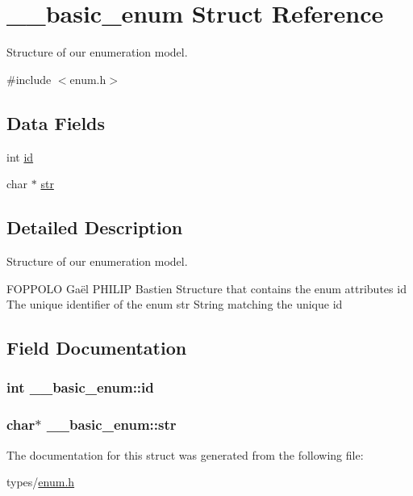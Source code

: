 \hypertarget{struct____basic__enum}{}\section{\+\_\+\+\_\+basic\+\_\+enum Struct Reference}
\label{struct____basic__enum}


Structure of our enumeration model.  




{\ttfamily \#include $<$enum.\+h$>$}

\subsection*{Data Fields}
\begin{DoxyCompactItemize}
\item 
int \hyperlink{struct____basic__enum_acd04c6cfadb03ffe9794095d30f357bc}{id}
\item 
char $\ast$ \hyperlink{struct____basic__enum_ad580200e599931c086006513b3a5a927}{str}
\end{DoxyCompactItemize}


\subsection{Detailed Description}
Structure of our enumeration model. 

F\+O\+P\+P\+O\+LO Gaël  P\+H\+I\+L\+IP Bastien Structure that contains the enum attributes  id The unique identifier of the enum  str String matching the unique id 

\subsection{Field Documentation}
\subsubsection[{\texorpdfstring{id}{id}}]{\setlength{\rightskip}{0pt plus 5cm}int \+\_\+\+\_\+basic\+\_\+enum\+::id}\hypertarget{struct____basic__enum_acd04c6cfadb03ffe9794095d30f357bc}{}\label{struct____basic__enum_acd04c6cfadb03ffe9794095d30f357bc}
\subsubsection[{\texorpdfstring{str}{str}}]{\setlength{\rightskip}{0pt plus 5cm}char$\ast$ \+\_\+\+\_\+basic\+\_\+enum\+::str}\hypertarget{struct____basic__enum_ad580200e599931c086006513b3a5a927}{}\label{struct____basic__enum_ad580200e599931c086006513b3a5a927}


The documentation for this struct was generated from the following file\+:\begin{DoxyCompactItemize}
\item 
types/\hyperlink{enum_8h}{enum.\+h}\end{DoxyCompactItemize}
